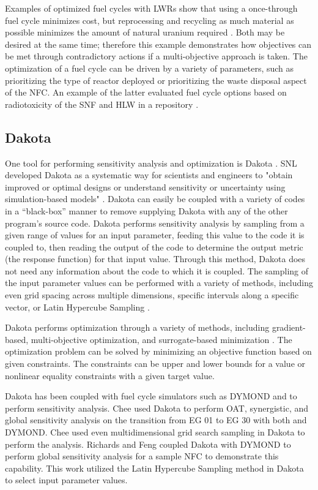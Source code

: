 Examples of optimized fuel cycles with \glspl{LWR} show that using a
once-through fuel cycle minimizes cost, but reprocessing and recycling as 
much material as possible minimizes the amount of natural uranium 
required \cite{kunsch_nuclear_1987}. Both may 
be desired at the same time; therefore this example demonstrates how 
objectives can be met through contradictory actions if a multi-objective 
approach is taken. The optimization of a fuel cycle can be driven 
by a variety of parameters, such as prioritizing the type of reactor 
deployed or prioritizing the waste disposal 
aspect of the \gls{NFC}. An example of the latter 
evaluated fuel cycle options based on radiotoxicity of the \gls{SNF} and 
\gls{HLW} in a repository \cite{del_cul_advanced_2010}. 


\subsection{Dakota}
One tool for performing sensitivity analysis and optimization is 
Dakota \cite{adams_dakota_2019}.
\gls{SNL} developed Dakota as a systematic way for scientists and 
engineers to "obtain improved or optimal designs or understand sensitivity
or uncertainty using simulation-based models" \cite{adams_dakota_2019}.
Dakota can easily be coupled with a variety of codes in a ``black-box'' 
manner
to remove supplying Dakota with any of the other program's source code.
Dakota performs sensitivity analysis by sampling from a given range of 
values for an input parameter, feeding this value to the code it is 
coupled to, then reading the output of the code to determine the output 
metric (the response function) for that input value. Through this method, 
Dakota does not need any information about the code to which it is coupled. 
The sampling of the input parameter values can be performed with a variety of 
methods, including even grid spacing across multiple dimensions, specific 
intervals along a specific vector, or Latin Hypercube Sampling 
\cite{adams_dakota_2019}.

Dakota performs optimization through a variety of methods, including
gradient-based, multi-objective optimization, and surrogate-based 
minimization \cite{adams_dakota_2019}. The optimization problem can be 
solved by minimizing an objective function based on given constraints. The 
constraints can be upper and lower bounds for a value or nonlinear 
equality constraints with a given target value. 

Dakota has been coupled with fuel cycle simulators such as \gls{DYMOND} and 
\Cyclus 
\cite{chee_sensitivity_2019,richards_application_2021} to perform sensitivity 
analysis. Chee \cite{chee_sensitivity_2019} used Dakota to perform 
\gls{OAT}, synergistic, and global sensitivity analysis on the transition 
from \gls{EG} 01 to \gls{EG} 30 with both \Cyclus and \gls{DYMOND}. Chee used even 
multidimensional grid search sampling in Dakota to perform the analysis. 
Richards and Feng \cite{richards_application_2021} coupled Dakota with 
\gls{DYMOND} to perform global sensitivity analysis for a sample \gls{NFC} 
to demonstrate this capability. This work utilized the Latin Hypercube 
Sampling method in Dakota to select input parameter values. 


